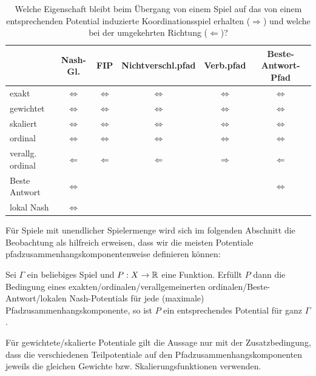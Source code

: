 \begin{table}[h]\centering
	\begin{tabular}{l|ccccc}
						& Nash-Gl. 			& FIP 					& Nichtverschl.pfad 			& Verb.pfad 		& Beste-Antwort-Pfad \\\hline
		exakt			& $\Leftrightarrow$	& $\Leftrightarrow$ 	& $\Leftrightarrow$				& $\Leftrightarrow$	& $\Leftrightarrow$ \\
		gewichtet		& $\Leftrightarrow$	& $\Leftrightarrow$ 	& $\Leftrightarrow$				& $\Leftrightarrow$	& $\Leftrightarrow$ \\		
		skaliert		& $\Leftrightarrow$ & $\Leftrightarrow$ 	& $\Leftrightarrow$				& $\Leftrightarrow$	& $\Leftrightarrow$ \\
		ordinal			& $\Leftrightarrow$	& $\Leftrightarrow$ 	& $\Leftrightarrow$				& $\Leftrightarrow$	& $\Leftrightarrow$ \\
		verallg. ordinal& $\Leftarrow$		& $\Leftarrow$		 	& $\Leftarrow$					& $\Rightarrow$		& $\Leftarrow$ 	\\
		Beste Antwort	& $\Leftrightarrow$	& 					 	& 								& 					& $\Leftrightarrow$ \\
		lokal Nash		& $\Leftrightarrow$	& 					 	& 								& 					& 					
	\end{tabular}	
	\caption{Welche Eigenschaft bleibt beim Übergang von einem Spiel auf das von einem entsprechenden Potential induzierte Koordinationsspiel erhalten ($\Rightarrow$) und welche bei der umgekehrten Richtung ($\Leftarrow$)?}\label{tab:PotErhalten}
\end{table}

Für Spiele mit unendlicher Spielermenge wird sich im folgenden Abschnitt die Beobachtung als hilfreich erweisen, dass wir die meisten Potentiale pfadzusammenhangskomponentenweise definieren können:

\begin{beob}\label{beob:KompWeisePotentiale}
	Sei $\Gamma$ ein beliebiges Spiel und $P: X \to \mathbb{R}$ eine Funktion. Erfüllt $P$ dann die Bedingung eines exakten/ordinalen/verallgemeinerten ordinalen/Beste-Antwort/lokalen Nash-Potentials für jede (maximale) Pfadzusammenhangskomponente, so ist $P$ ein entsprechendes Potential für ganz $\Gamma$.
	
	Für gewichtete/skalierte Potentiale gilt die Aussage nur mit der Zusatzbedingung, dass die verschiedenen Teilpotentiale auf den Pfadzusammenhangskomponenten jeweils die gleichen Gewichte bzw. Skalierungsfunktionen verwenden.
\end{beob}

